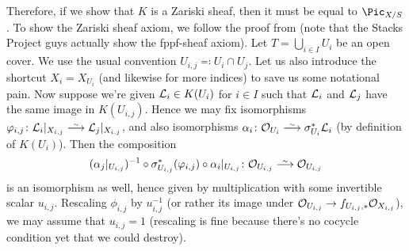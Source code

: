 \documentclass[a4paper,parskip=half,numbers=enddot, DIV=12]{scrreprt}
\begin{document}
\begin{example}
	Therefore, if we show that $K$ is a Zariski sheaf, then it must be equal to $\Pic_{X/S}$. To show the Zariski sheaf axiom, we follow the proof from \cite[]{stacks-project} (note that the Stacks Project guys actually show the fppf-sheaf axiom). Let $T=\bigcup_{i\in I}U_i$ be an open cover. We use the usual convention $U_{i,j}\eqqcolon U_i\cap U_j$. Let us also introduce the shortcut $X_i=X_{U_i}$ (and likewise for more indices) to save us some notational pain. Now suppose we're given $\mathcal{L}_i\in K(U_i)$ for $i\in I$ such that $\mathcal{L}_i$ and $\mathcal{L}_j$ have the same image in $K(U_{i,j})$. Hence we may fix isomorphisms $\phi_{i,j}\colon \Ll_i|_{X_{i,j}}\isomorphism\Ll_j|_{X_{i,j}}$, and also isomorphisms $\alpha_i\colon \Oo_{U_i}\isomorphism \sigma_{U_i}^*\Ll_i$ (by definition of $K(U_i)$). Then the composition
	\begin{align*}
		(\alpha_j|_{U_{i,j}})^{-1}\circ\sigma_{U_{i,j}}^*(\phi_{i,j})\circ\alpha_i|_{U_{i,j}}\colon \Oo_{U_{i,j}}\isomorphism \Oo_{U_{i,j}}
	\end{align*}
	is an isomorphism as well, hence given by multiplication with some invertible scalar $u_{i,j}$. Rescaling $\phi_{i,j}$ by $u_{i,j}^{-1}$ (or rather its image under $\Oo_{U_{i,j}}\morphism f_{U_{i,j},*}\Oo_{X_{i,j}}$), we may assume that $u_{i,j}=1$ (rescaling is fine because there's no cocycle condition yet that we could destroy).
	

\end{example}
\end{document}
